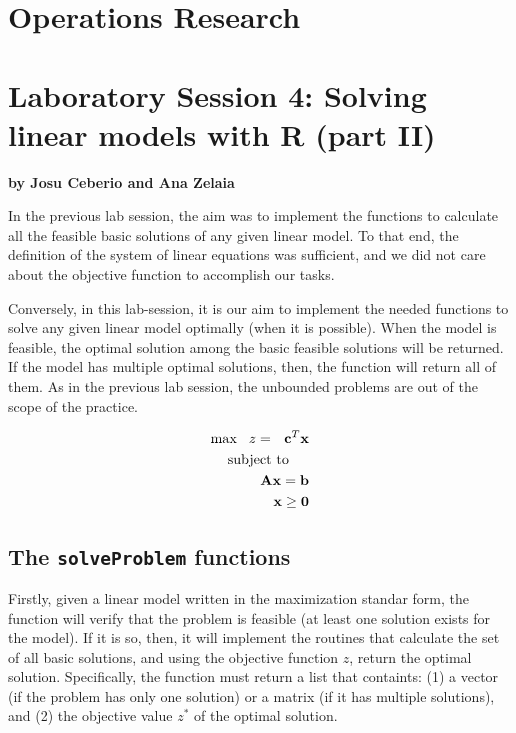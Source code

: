 \documentclass[
]{article}
\author{}
\date{\vspace{-2.5em}}
\begin{document}
\hypertarget{operations-research}{%
\section{Operations Research}\label{operations-research}}

\hypertarget{laboratory-session-4-solving-linear-models-with-r-part-ii}{%
\section{Laboratory Session 4: Solving linear models with R (part
II)}\label{laboratory-session-4-solving-linear-models-with-r-part-ii}}

\textbf{by Josu Ceberio and Ana Zelaia}

In the previous lab session, the aim was to implement the functions to
calculate all the feasible basic solutions of any given linear model. To
that end, the definition of the system of linear equations was
sufficient, and we did not care about the objective function to
accomplish our tasks.

Conversely, in this lab-session, it is our aim to implement the needed
functions to solve any given linear model optimally (when it is
possible). When the model is feasible, the optimal solution among the
basic feasible solutions will be returned. If the model has multiple
optimal solutions, then, the function will return all of them. As in the
previous lab session, the unbounded problems are out of the scope of the
practice.

\begin{eqnarray*}
\max\ \ z= \ \ {\bf c}^{T}{\bf x} \\
\mbox{subject to}\hspace{0,5cm}\\
{\bf A}{\bf x} = {\bf b} \\
{\bf x} \geq {\bf 0}
\end{eqnarray*}

\hypertarget{the-solveproblem-functions}{%
\subsection{\texorpdfstring{The \texttt{solveProblem}
functions}{The solveProblem functions}}\label{the-solveproblem-functions}}

Firstly, given a linear model written in the maximization standar form,
the function will verify that the problem is feasible (at least one
solution exists for the model). If it is so, then, it will implement the
routines that calculate the set of all basic solutions, and using the
objective function \(z\), return the optimal solution. Specifically, the
function must return a list that containts: (1) a vector (if the problem
has only one solution) or a matrix (if it has multiple solutions), and
(2) the objective value \(z^*\) of the optimal solution.
\end{document}
